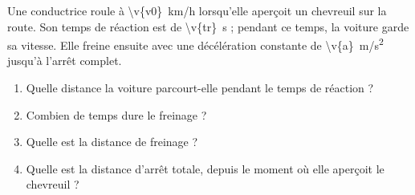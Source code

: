 Une conductrice roule à \qty{\v{v0}}{km/h} lorsqu'elle aperçoit un chevreuil sur la route. Son temps de réaction est de \qty{\v{tr}}{s} ; pendant ce temps, la voiture garde sa vitesse. Elle freine ensuite avec une décélération constante de \qty{\v{a}}{m/s^2} jusqu'à l'arrêt complet.

\begin{enumerate}[label=\alph*)]
    \item Quelle distance la voiture parcourt-elle pendant le temps de réaction ?
    \item Combien de temps dure le freinage ?
    \item Quelle est la distance de freinage ?
    \item Quelle est la distance d'arrêt totale, depuis le moment où elle aperçoit le chevreuil ?
\end{enumerate}
